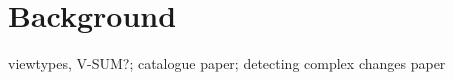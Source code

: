 \section{Background}
\label{sec:Background}

viewtypes, V-SUM?; catalogue paper; detecting complex changes paper
